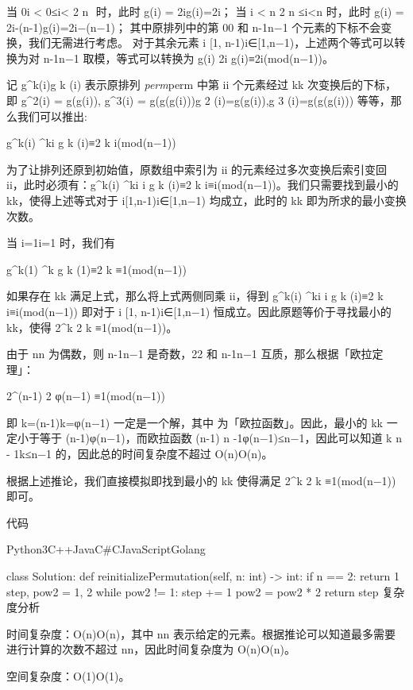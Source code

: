当 0\le i < 0≤i< 
2
n
​
  时，此时 g(i) = 2ig(i)=2i；
当  \le i < n 
2
n
​
 ≤i<n 时，此时 g(i) = 2i-(n-1)g(i)=2i−(n−1)；
其中原排列中的第 00 和 n-1n−1 个元素的下标不会变换，我们无需进行考虑。 对于其余元素 i \in [1, n-1)i∈[1,n−1)，上述两个等式可以转换为对 n-1n−1 取模，等式可以转换为 g(i) \equiv 2i g(i)≡2i(mod(n−1))。

记 g^k(i)g 
k
 (i) 表示原排列 \textit{perm}perm 中第 ii 个元素经过 kk 次变换后的下标，即 g^2(i) = g(g(i)), g^3(i) = g(g(g(i)))g 
2
 (i)=g(g(i)),g 
3
 (i)=g(g(g(i))) 等等，那么我们可以推出:

g^k(i) ^ki 
g 
k
 (i)≡2 
k
 i(mod(n−1))

为了让排列还原到初始值，原数组中索引为 ii 的元素经过多次变换后索引变回 ii，此时必须有：g^k(i) ^ki \equiv i g 
k
 (i)≡2 
k
 i≡i(mod(n−1))。我们只需要找到最小的 kk，使得上述等式对于 i\in[1,n-1)i∈[1,n−1) 均成立，此时的 kk 即为所求的最小变换次数。

当 i=1i=1 时，我们有

g^k(1) ^k  
g 
k
 (1)≡2 
k
 ≡1(mod(n−1))

如果存在 kk 满足上式，那么将上式两侧同乘 ii，得到 g^k(i) ^ki \equiv i g 
k
 (i)≡2 
k
 i≡i(mod(n−1)) 即对于 i \in [1, n-1)i∈[1,n−1) 恒成立。因此原题等价于寻找最小的 kk，使得 2^k  2 
k
 ≡1(mod(n−1))。

由于 nn 为偶数，则 n-1n−1 是奇数，22 和 n-1n−1 互质，那么根据「欧拉定理」：

2^{\varphi(n-1)}  
2 
φ(n−1)
 ≡1(mod(n−1))

即 k=\varphi(n-1)k=φ(n−1) 一定是一个解，其中  为「欧拉函数」。因此，最小的 kk 一定小于等于 \varphi(n-1)φ(n−1)，而欧拉函数 \varphi(n-1) \le n -1φ(n−1)≤n−1，因此可以知道 k \le n - 1k≤n−1 的，因此总的时间复杂度不超过 O(n)O(n)。

根据上述推论，我们直接模拟即找到最小的 kk 使得满足 2^k  2 
k
 ≡1(mod(n−1)) 即可。

代码

Python3C++JavaC#CJavaScriptGolang

class Solution:
    def reinitializePermutation(self, n: int) -> int:
        if n == 2:
            return 1
        step, pow2 = 1, 2
        while pow2 != 1:
            step += 1
            pow2 = pow2 * 2 %
        return step
复杂度分析

时间复杂度：O(n)O(n)，其中 nn 表示给定的元素。根据推论可以知道最多需要进行计算的次数不超过 nn，因此时间复杂度为 O(n)O(n)。

空间复杂度：O(1)O(1)。